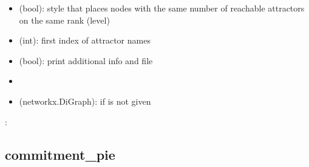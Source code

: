 \documentclass[letterpaper,10pt,english]{sphinxmanual}
\begin{document}
\begin{fulllineitems}
\begin{description}
\begin{itemize}
\item {} 
 (bool): style that places nodes with the same number of reachable attractors on the same rank (level)

\item {} 
 (int): first index of attractor names

\item {} 
 (bool): print additional info and  file

\end{itemize}

\item[{\sphinxstylestrong{returns}::}] \leavevmode\begin{itemize}
\item {} 

\item {} 
 (networkx.DiGraph): if  is not given

\end{itemize}

\end{description}

:

\begin{sphinxVerbatim}[commandchars=\\\{\}]
  
   
\end{sphinxVerbatim}

\end{fulllineitems}



\subsection{commitment\_pie}
\label{\detokenize{Basins:commitment-pie}}\label{\detokenize{Basins:id8}}
\end{document}
